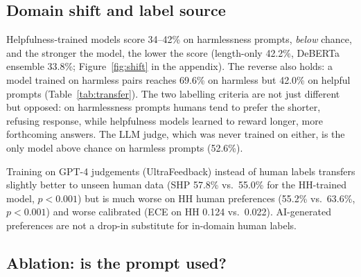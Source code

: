\documentclass[11pt]{article}
\begin{document}
\subsection{Domain shift and label source}
\label{sec:shift}

\begin{table}[t]
\centering
\small
\setlength{\tabcolsep}{3.5pt}
\caption{Transfer matrix for the BERT cross-encoder (accuracy). Harmless: the held-out harmless test split (3,993 pairs). UF: UltraFeedback test set.}
\label{tab:transfer}
\end{table}

Helpfulness-trained models score 34--42\% on harmlessness prompts, \emph{below} chance, and the stronger the model, the lower the score (length-only 42.2\%, DeBERTa ensemble 33.8\%; Figure~\ref{fig:shift} in the appendix). The reverse also holds: a model trained on harmless pairs reaches 69.6\% on harmless but 42.0\% on helpful prompts (Table~\ref{tab:transfer}). The two labelling criteria are not just different but opposed: on harmlessness prompts humans tend to prefer the shorter, refusing response, while helpfulness models learned to reward longer, more forthcoming answers. The LLM judge, which was never trained on either, is the only model above chance on harmless prompts (52.6\%).

Training on GPT-4 judgements (UltraFeedback) instead of human labels transfers slightly better to unseen human data (SHP 57.8\% vs.\ 55.0\% for the HH-trained model, $p<0.001$) but is much worse on HH human preferences (55.2\% vs.\ 63.6\%, $p<0.001$) and worse calibrated (ECE on HH 0.124 vs.\ 0.022). AI-generated preferences are not a drop-in substitute for in-domain human labels.

\subsection{Ablation: is the prompt used?}
\end{document}
